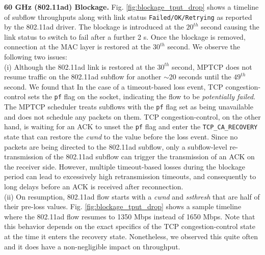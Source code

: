 \noindent\textbf{60 GHz (802.11ad) Blockage. } Fig. \ref{fig:blockage_tput_drop} shows a
timeline of subflow throughputs along with link status {\tt Failed/OK/Retrying} as reported by 
the 802.11ad driver. The blockage is introduced at the $20^{th}$ second causing the link status 
to switch to fail after a further 2 s. Once the blockage is removed, connection at the MAC layer is
restored at the $30^{th}$ second. We observe the following two issues:
\\
(i) Although the 802.11ad link is restored at the $30^{th}$ second, MPTCP does not resume traffic 
on the 802.11ad subflow for another $\sim$20 seconds until the $49^{th}$ second. We found that
In the case of a timeout-based loss event, TCP congestion-control sets the {\tt pf} flag on the socket,
indicating the flow to be \emph{potentially failed}. The MPTCP scheduler treats subflows with 
the {\tt pf} flag set as being unavailable and does not schedule any packets on them. TCP
congestion-control, on the other hand, is waiting for an ACK to unset
the {\tt pf} flag and enter the {\tt TCP\_CA\_RECOVERY} state that can
restore the \emph{cwnd} to the value before the loss event. Since no
packets are being directed to the 802.11ad subflow, only a subflow-level re-transmission 
of the 802.11ad subflow can trigger the transmission of an ACK on the receiver side. However, 
multiple timeout-based losses during the blockage period can lead to excessively 
high retransmission timeouts, and consequently to long delays before an ACK is received after 
reconnection.
\\
(ii) On resumption, 802.11ad flow starts with a \emph{cwnd} and
\emph{ssthresh} that are half of their pre-loss values. Fig. \ref{fig:blockage_tput_drop} shows 
a sample timeline where the 802.11ad flow resumes to 1350 Mbps instead of 1650 Mbps. Note that
this behavior depends on the exact specifics of the TCP congestion-control state at the time 
it enters the recovery state. Nonetheless, we observed this quite often and it does have a
non-negligible impact on throughput.
